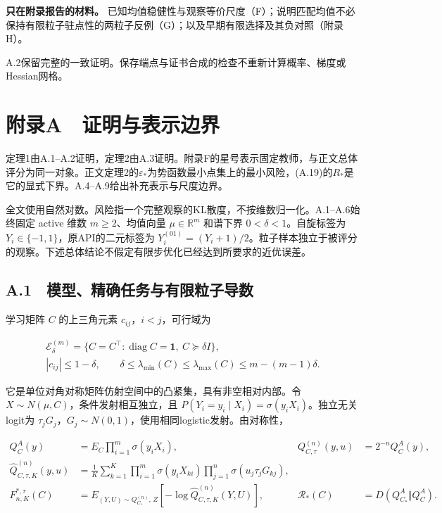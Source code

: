 \documentclass[11pt,a4paper]{article}
\begin{document}
\textbf{只在附录报告的材料。}
已知均值稳健性与观察等价尺度（F）；说明匹配均值不必保持有限粒子驻点性的两粒子反例（G）；以及早期有限选择及其负对照（附录H）。

A.2保留完整的一致证明。保存端点与证书合成的检查不重新计算概率、梯度或Hessian网格。

\clearpage

\section*{附录A　证明与表示边界}\label{ux9644ux5f55a-ux8bc1ux660eux4e0eux8868ux793aux8fb9ux754c}

定理1由A.1--A.2证明，定理2由A.3证明。附录F的星号表示固定教师，与正文总体评分为同一对象。正文定理2的\(\varepsilon_*\)为势函数最小点集上的最小风险，(A.19)的\(R_*\)是它的显式下界。A.4--A.9给出补充表示与尺度边界。

全文使用自然对数。风险指一个完整观察的KL散度，不按维数归一化。A.1--A.6始终固定
active 维数 \(m\ge2\)、均值向量 \(\mu\in\mathbb R^m\) 和谱下界
\(0<\delta<1\)。自旋标签为 \(Y_i\in\{-1,1\}\)，原API的二元标签为
\(Y_i^{(01)}=(Y_i+1)/2\)。粒子样本独立于被评分的观察。下述总体结论不假定有限步优化已经达到所要求的近优误差。

\subsection*{A.1　模型、精确任务与有限粒子导数}\label{a.1-ux6a21ux578bux7cbeux786eux4efbux52a1ux4e0eux6709ux9650ux7c92ux5b50ux5bfcux6570}

学习矩阵 \(C\) 的上三角元素 \(c_{ij}\)，\(i<j\)，可行域为

\[
\begin{gathered}
\mathcal E_\delta^{(m)}
=\{C=C^\top:\operatorname{diag}C=\mathbf1,\ C\succeq\delta I\},\\
|c_{ij}|\le1-\delta,\qquad
\delta\le\lambda_{\min}(C)\le\lambda_{\max}(C)\le m-(m-1)\delta .
\end{gathered}
\tag{A.1}
\]

它是单位对角对称矩阵仿射空间中的凸紧集，具有非空相对内部。令
\(X\sim N(\mu,C)\)，条件发射相互独立，且
\(P(Y_i=y_i\mid X_i)=\sigma(y_iX_i)\)。独立无关logit为
\(\tau_jG_j\)，\(G_j\sim N(0,1)\)，使用相同logistic发射。由对称性，

\[
\begin{aligned}
Q_C^A(y)&=E_C\prod_{i=1}^m\sigma(y_iX_i),&
Q_{C,\tau}^{(n)}(y,u)&=2^{-n}Q_C^A(y),\\
\widehat Q_{C,\tau,K}^{(n)}(y,u)
&=\frac1K\sum_{k=1}^K
\prod_{i=1}^m\sigma(y_iX_{ki})\prod_{j=1}^n\sigma(u_j\tau_jG_{kj}),\\
F_{n,K}^{*,\tau}(C)&=E_{(Y,U)\sim Q_{C_*}^{(n)},\,Z}
[-\log\widehat Q_{C,\tau,K}^{(n)}(Y,U)],&
\mathcal R_*(C)&=D(Q_{C_*}^A\Vert Q_C^A).
\end{aligned}
\tag{A.2}
\]
\end{document}

